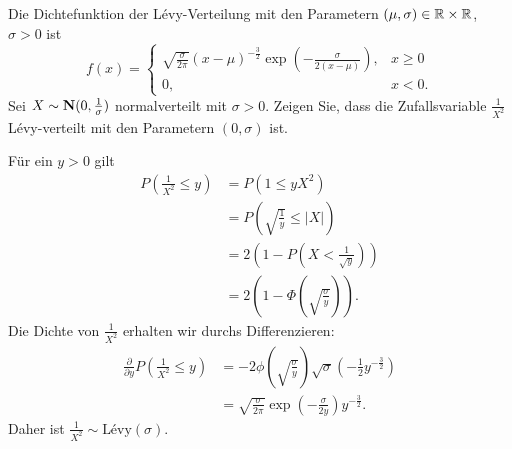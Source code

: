  Die Dichtefunktion der
L\'evy-Verteilung mit den Parametern $(\mu,\sigma)\in \mathbb R\times\mathbb R$, $\sigma>0$ ist
\begin{equation*}
    f(x) = 
    \begin{cases}
    \sqrt{ \frac{\sigma}{2\pi}} (x-\mu)^{-\frac{3}{2}} \exp\left( -\frac{\sigma}{2(x-\mu)} \right), & x\geq 0 \\
    0, & x<0.
    \end{cases}
\end{equation*}
Sei $X\sim \mathbf N (0, \frac{1}{\sigma})$ normalverteilt mit $\sigma>0$.  Zeigen
Sie, dass die Zufallsvariable $\frac{1}{X^2}$ L\'evy-verteilt mit den
Parametern $(0,\sigma)$ ist.

\solution 
Für ein $y>0$ gilt
\begin{align*}
    P \left( \frac{1}{X^{2}} \leq y \right) &= P \left( 1 \leq y X^{2}   \right) \\
    &= P \left( \sqrt{\frac{1}{y}} \leq | X | \right) \\
    &= 2 \left( 1 - P \left( X < \frac{1}{\sqrt{y}} \right) \right) \\
    &= 2 \left( 1 - \Phi\left( \sqrt{ \frac{\sigma}{y}} \right) \right).
\end{align*}
Die Dichte von $\frac{1}{X^2}$ erhalten wir durchs Differenzieren:
\begin{align*}
    \frac{\partial}{\partial y} P \left( \frac{1}{X^2} \leq y \right) &=
    -2 \phi \left( \sqrt{\frac{\sigma}{y}} \right) \sqrt{\sigma} 
    \left( -\frac{1}{2} y^{-\frac{3}{2}} \right) \\
    &= \sqrt{\frac{\sigma}{2 \pi}} \exp \left( - \frac{\sigma}{2 y} \right) y^{-\frac{3}{2}}.
\end{align*}
Daher ist $\frac{1}{X^2} \sim \text{L\'evy}(\sigma)$.



